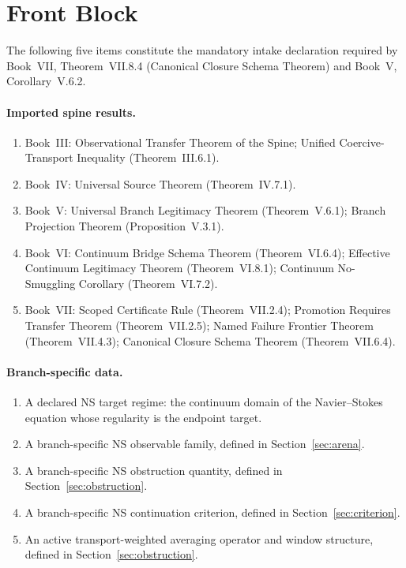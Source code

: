 \documentclass[12pt,oneside]{amsbook}
\theoremstyle{plain}
\theoremstyle{definition}
\theoremstyle{remark}
\begin{document}
\section*{Front Block}

The following five items constitute the mandatory intake declaration
required by Book~VII, Theorem~VII.8.4 (Canonical Closure Schema
Theorem) and Book~V, Corollary~V.6.2.

\paragraph{Imported spine results.}
\begin{enumerate}[label=\textup{(\arabic*)}]
 \item Book~III: Observational Transfer Theorem of the Spine;
 Unified Coercive-Transport Inequality
 (Theorem~III.6.1).
 \item Book~IV: Universal Source Theorem (Theorem~IV.7.1).
 \item Book~V: Universal Branch Legitimacy Theorem
 (Theorem~V.6.1); Branch Projection Theorem
 (Proposition~V.3.1).
 \item Book~VI: Continuum Bridge Schema Theorem
 (Theorem~VI.6.4); Effective Continuum Legitimacy
 Theorem (Theorem~VI.8.1); Continuum No-Smuggling
 Corollary (Theorem~VI.7.2).
 \item Book~VII: Scoped Certificate Rule (Theorem~VII.2.4);
 Promotion Requires Transfer Theorem
 (Theorem~VII.2.5); Named Failure Frontier Theorem
 (Theorem~VII.4.3); Canonical Closure Schema Theorem
 (Theorem~VII.6.4).
\end{enumerate}

\paragraph{Branch-specific data.}
\begin{enumerate}[label=\textup{(\arabic*)}]
 \item A declared NS target regime: the continuum domain of
 the Navier--Stokes equation whose regularity is the
 endpoint target.
 \item A branch-specific NS observable family, defined in
 Section~\ref{sec:arena}.
 \item A branch-specific NS obstruction quantity, defined in
 Section~\ref{sec:obstruction}.
 \item A branch-specific NS continuation criterion, defined
 in Section~\ref{sec:criterion}.
 \item An active transport-weighted averaging operator and
 window structure, defined in
 Section~\ref{sec:obstruction}.
\end{enumerate}
\end{document}

